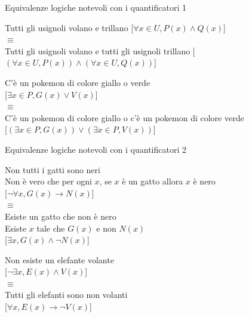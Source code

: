 \documentclass[aspectratio=169,10pt]{beamer}
\begin{document}
\begin{frame}{Equivalenze logiche notevoli con i quantificatori 1}
    \begin{example}
        Tutti gli usignoli volano e trillano [\alert{$\forall x\in U , P(x) \wedge Q(x)$}]\\
        \medskip
        \hspace{1cm}$\equiv$\\
        \medskip
        Tutti gli usignoli volano e tutti gli usignoli trillano [\alert{$(\forall x \in U, P(x)) \wedge (\forall x \in U, Q(x))$}]
    \end{example}

    \begin{example}
        C'è un pokemon di colore giallo o verde\\[0cm] [\alert{$\exists x \in P, G(x) \vee V(x)$}]\\
        \medskip
        \hspace{1cm}$\equiv$\\
        \medskip
        C'è un pokemon di colore giallo o c'è un pokemon di colore verde\\[0cm] [\alert{$(\exists x \in P, G(x)) \vee (\exists x \in P, V(x))$}]
    \end{example}
\end{frame}

\begin{frame}{Equivalenze logiche notevoli con i quantificatori 2}
    \begin{example}
        Non tutti i gatti sono neri\\
        Non è vero che per ogni $x$, se $x$ è un gatto allora $x$ è nero\\[0cm]
        [\alert{$\neg \forall x, G(x) \to N(x)$}]\\
        \medskip
        \hspace{1cm}$\equiv$\\
        \medskip
        Esiste un gatto che non è nero\\
        Esiste $x$ tale che $G(x)$ e non $N(x)$\\[0cm]
        [\alert{$\exists x, G(x) \wedge \neg N(x)$}]
    \end{example}

    \begin{example}
        Non esiste un elefante volante\\[0cm]
        [\alert{$\neg \exists x, E(x) \wedge  V(x)$}]\\[0cm]
        \medskip
        \hspace{1cm}$\equiv$\\
        \medskip
        Tutti gli elefanti sono non volanti\\[0cm]
        [\alert{$\forall x, E(x) \to \neg V(x)$}]
    \end{example}
\end{frame}
\end{document}
